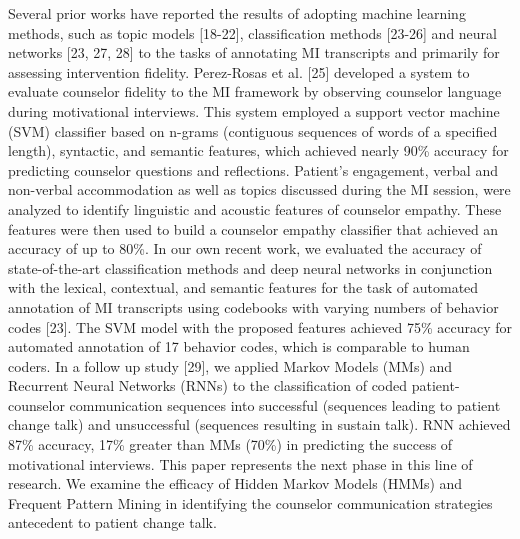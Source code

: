 Several prior works have reported the results of adopting machine learning methods, such as topic models [18-22], classification methods [23-26] and neural networks [23, 27, 28] to the tasks of annotating MI transcripts and primarily for assessing intervention fidelity. Perez-Rosas et al. [25] developed a system to evaluate counselor fidelity to the MI framework by observing counselor language during motivational interviews. This system employed a support vector machine (SVM) classifier based on n-grams (contiguous sequences of words of a specified length), syntactic, and semantic features, which achieved nearly 90\% accuracy for predicting counselor questions and reflections. Patient’s engagement, verbal and non-verbal accommodation as well as topics discussed during the MI session, were analyzed to identify linguistic and acoustic features of counselor empathy. These features were then used to build a counselor empathy classifier that achieved an accuracy of up to 80\%. In our own recent work, we evaluated the accuracy of state-of-the-art classification methods and deep neural networks in conjunction with the lexical, contextual, and semantic features for the task of automated annotation of MI transcripts using codebooks with varying numbers of behavior codes [23]. The SVM model with the proposed features achieved 75\% accuracy for automated annotation of 17 behavior codes, which is comparable to human coders. In a follow up study [29], we applied Markov Models (MMs) and Recurrent Neural Networks (RNNs) to the classification of coded patient-counselor communication sequences into successful (sequences leading to patient change talk) and unsuccessful (sequences resulting in sustain talk). RNN achieved 87\% accuracy, 17\% greater than MMs (70\%) in predicting the success of motivational interviews. This paper represents the next phase in this line of research. We examine the efficacy of Hidden Markov Models (HMMs) and Frequent Pattern Mining in identifying the counselor communication strategies antecedent to patient change talk.

